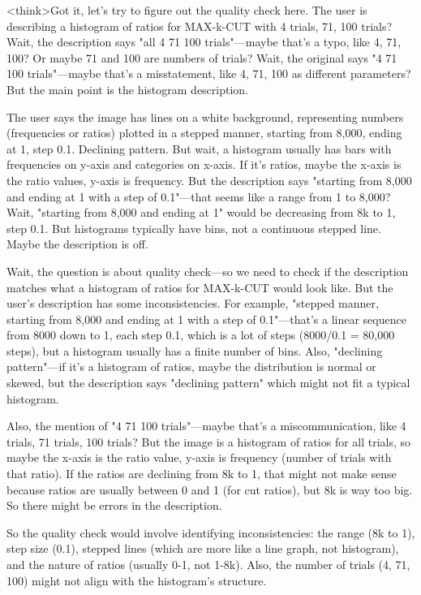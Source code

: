 <think>Got it, let's try to figure out the quality check here. The user is describing a histogram of ratios for MAX-k-CUT with 4 trials, 71, 100 trials? Wait, the description says "all 4 71 100 trials"—maybe that's a typo, like 4, 71, 100? Or maybe 71 and 100 are numbers of trials? Wait, the original says "4 71 100 trials"—maybe that's a misstatement, like 4, 71, 100 as different parameters? But the main point is the histogram description.

The user says the image has lines on a white background, representing numbers (frequencies or ratios) plotted in a stepped manner, starting from 8,000, ending at 1, step 0.1. Declining pattern. But wait, a histogram usually has bars with frequencies on y-axis and categories on x-axis. If it's ratios, maybe the x-axis is the ratio values, y-axis is frequency. But the description says "starting from 8,000 and ending at 1 with a step of 0.1"—that seems like a range from 1 to 8,000? Wait, "starting from 8,000 and ending at 1" would be decreasing from 8k to 1, step 0.1. But histograms typically have bins, not a continuous stepped line. Maybe the description is off.

Wait, the question is about quality check—so we need to check if the description matches what a histogram of ratios for MAX-k-CUT would look like. But the user's description has some inconsistencies. For example, "stepped manner, starting from 8,000 and ending at 1 with a step of 0.1"—that's a linear sequence from 8000 down to 1, each step 0.1, which is a lot of steps (8000/0.1 = 80,000 steps), but a histogram usually has a finite number of bins. Also, "declining pattern"—if it's a histogram of ratios, maybe the distribution is normal or skewed, but the description says "declining pattern" which might not fit a typical histogram.

Also, the mention of "4 71 100 trials"—maybe that's a miscommunication, like 4 trials, 71 trials, 100 trials? But the image is a histogram of ratios for all trials, so maybe the x-axis is the ratio value, y-axis is frequency (number of trials with that ratio). If the ratios are declining from 8k to 1, that might not make sense because ratios are usually between 0 and 1 (for cut ratios), but 8k is way too big. So there might be errors in the description.

So the quality check would involve identifying inconsistencies: the range (8k to 1), step size (0.1), stepped lines (which are more like a line graph, not histogram), and the nature of ratios (usually 0-1, not 1-8k). Also, the number of trials (4, 71, 100) might not align with the histogram's structure.

